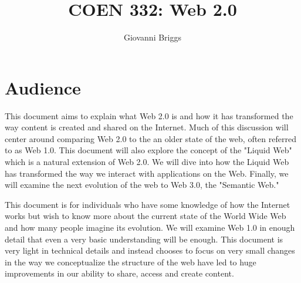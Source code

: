 \documentclass[12pt]{article}
\begin{document}
\title{COEN 332: Web 2.0}
\author{Giovanni Briggs}

\maketitle

\clearpage

\tableofcontents
\clearpage

{}
\listoffigures


\glsaddall
\printglossary[type=\acronymtype, nonumberlist] %
\clearpage

\section{Audience}
This document aims to explain what Web 2.0 is and how it has transformed the way content is created and shared on the Internet.  Much of this discussion will center around comparing Web 2.0 to the an older state of the web, often referred to as Web 1.0.  This document will also explore the concept of the "Liquid Web" which is a natural extension of Web 2.0.  We will dive into how the Liquid Web has transformed the way we interact with applications on the Web.  Finally, we will examine the next evolution of the web to Web 3.0, the "Semantic Web."

This document is for individuals who have some knowledge of how the Internet works but wish to know more about the current state of the World Wide Web and how many people imagine its evolution.  We will examine Web 1.0 in enough detail that even a very basic understanding will be enough.  This document is very light in technical details and instead chooses to focus on very small changes in the way we conceptualize the structure of the web have led to huge improvements in our ability to share, access and create content.
\end{document}
